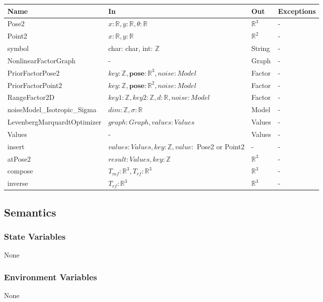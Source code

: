 \documentclass[12pt, titlepage]{article}
\begin{document}
\begin{center}
\begin{tabular}{p{6cm} p{6cm} p{2cm} p{3cm}}
\hline
\textbf{Name} & \textbf{In} & \textbf{Out} & \textbf{Exceptions} \\
\hline
Pose2 & $x: \mathbb{R}, y: \mathbb{R}, \theta: \mathbb{R}$ & $\mathbb{R}^{3}$ & - \\
Point2 & $x: \mathbb{R}, y: \mathbb{R}$  & $\mathbb{R}^{2}$  & - \\
symbol & char: char, int: $\mathbb{Z}$  & String & - \\
NonlinearFactorGraph & - & Graph & - \\
PriorFactorPose2 & $key:\mathbb{Z}, \textbf{pose}: \mathbb{R}^3, noise: Model$ & Factor & - \\
PriorFactorPoint2 & $key:\mathbb{Z}, \textbf{pose}: \mathbb{R}^2, noise: Model$& Factor& - \\
RangeFactor2D &  $key1: \mathbb{Z}, key2: \mathbb{Z}, d: \mathbb{R}, noise: Model$  & Factor & - \\
noiseModel\_Isotropic\_Sigma & $dim: \mathbb{Z}, \sigma: \mathbb{R}$ & Model & - \\
LevenbergMarquardtOptimizer & $graph: Graph, values: Values$ & Values & - \\
Values & - & Values & - \\
insert & $values: Values, key: \mathbb{Z}, value:$ Pose2 or Point2 & - & - \\
atPose2 & $result: Values, key: \mathbb{Z}$  & $\mathbb{R}^3$ & - \\
compose & $T_{mf}: \mathbb{R}^3, T_{rf}: \mathbb{R}^3$ & $\mathbb{R}^3$ & - \\
inverse &  $T_{rf}: \mathbb{R}^3$ & $\mathbb{R}^3$ & - \\
\hline
\end{tabular}
\end{center}

\subsection{Semantics}

\subsubsection{State Variables}
None

\subsubsection{Environment Variables}
None
\end{document}
